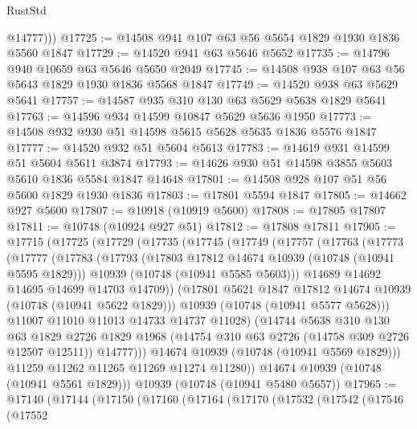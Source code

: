 \begin{lexlean}{RustStd}
\begin{coremodule}
          @14777)))
@17725 := @14508 @941 @107 @63 @56 @5654 @1829 @1930 @1836 @5560 @1847
@17729 := @14520 @941 @63 @5646 @5652
@17735 := @14796 @940 @10659 @63 @5646 @5650 @2049
@17745 := @14508 @938 @107 @63 @56 @5643 @1829 @1930 @1836 @5568 @1847
@17749 := @14520 @938 @63 @5629 @5641
@17757 := @14587 @935 @310 @130 @63 @5629 @5638 @1829 @5641
@17763 := @14596 @934 @14599 @10847 @5629 @5636 @1950
@17773 := @14508 @932 @930 @51 @14598 @5615 @5628 @5635 @1836 @5576 @1847
@17777 := @14520 @932 @51 @5604 @5613
@17783 := @14619 @931 @14599 @51 @5604 @5611 @3874
@17793 := @14626 @930 @51 @14598 @3855 @5603 @5610 @1836 @5584 @1847 @14648
@17801 := @14508 @928 @107 @51 @56 @5600 @1829 @1930 @1836
@17803 := @17801 @5594 @1847
@17805 := @14662 @927 @5600
@17807 := @10918 (@10919 @5600)
@17808 := @17805 @17807
@17811 := @10748 (@10924 @927 @51)
@17812 := @17808 @17811
@17905 := @17715
    (@17725
      (@17729
        (@17735
          (@17745
            (@17749
              (@17757
                (@17763
                  (@17773
                    (@17777
                      (@17783
                        (@17793
                          (@17803 @17812 @14674 @10939 (@10748 (@10941 @5595 @1829)))
                          @10939
                          (@10748 (@10941 @5585 @5603)))
                        @14689
                        @14692
                        @14695
                        @14699
                        @14703
                        @14709))
                    (@17801 @5621 @1847 @17812 @14674 @10939 (@10748 (@10941 @5622 @1829)))
                    @10939
                    (@10748 (@10941 @5577 @5628)))
                  @11007
                  @11010
                  @11013
                  @14733
                  @14737
                  @11028)
                (@14744
                  @5638
                  @310
                  @130
                  @63
                  @1829
                  @2726
                  @1829
                  @1968
                  (@14754 @310 @63 @2726 (@14758 @309 @2726 @12507 @12511))
                  @14777)))
            @14674
            @10939
            (@10748 (@10941 @5569 @1829)))
          @11259
          @11262
          @11265
          @11269
          @11274
          @11280))
      @14674
      @10939
      (@10748 (@10941 @5561 @1829)))
    @10939
    (@10748 (@10941 @5480 @5657))
@17965 := @17140
    (@17144
      (@17150
        (@17160
          (@17164
            (@17170
              (@17532
                (@17542
                  (@17546
                    (@17552

\end{coremodule}
\end{lexlean}
